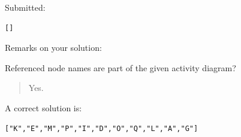 Submitted:


\begin{verbatim}
[]
\end{verbatim}


Remarks on your solution:

Referenced node names are part of the given activity diagram?\begin{quote}Yes.\end{quote}A correct solution is:
\begin{verbatim}
["K","E","M","P","I","D","O","Q","L","A","G"]
\end{verbatim}


